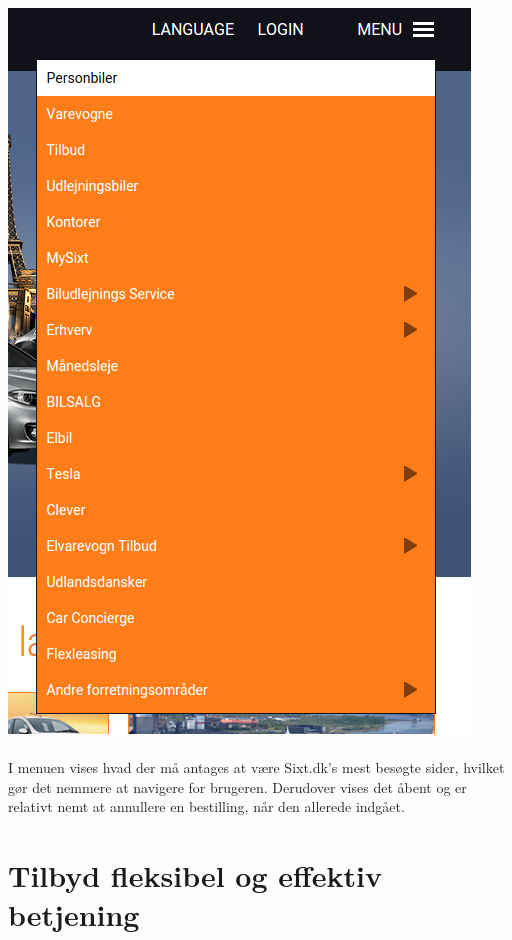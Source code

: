 \documentclass[12pt]{article}
\begin{document}
\includegraphics[scale=0.5]{img/menu}
\\
\\
I menuen vises hvad der må antages at være Sixt.dk's mest besøgte sider, hvilket gør det nemmere at navigere for brugeren. Derudover vises det åbent og er relativt nemt at annullere en bestilling, når den allerede indgået.

\section{Tilbyd fleksibel og effektiv betjening}
\end{document}
